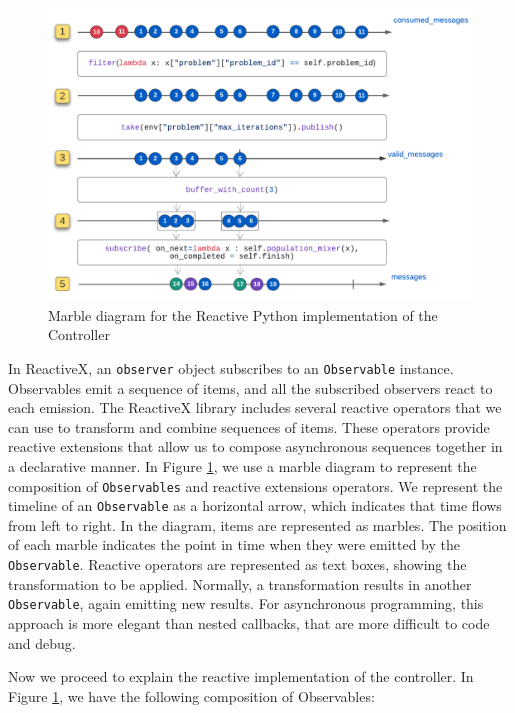 \documentclass[review]{elsarticle}
\begin{document}
\begin{figure}[ht]
    \centering
    \includegraphics[width=\textwidth]{marble_controller}
    \caption{Marble diagram for the Reactive Python implementation of the Controller}
    \label{fig:marble_controller}
\end{figure}

In ReactiveX, an \texttt{observer} object subscribes to an \texttt{Observable} instance. 
Observables emit a sequence of items, and all the subscribed observers react to each emission. The
ReactiveX library includes several reactive operators that we can use to
transform and combine sequences of items. These operators provide reactive
extensions that allow us to compose asynchronous sequences together in a
declarative manner. In Figure \ref{fig:marble_controller}, we use a marble diagram to
represent the composition of \texttt{Observables} and reactive extensions operators. We
represent the timeline of an \texttt{Observable} as a horizontal arrow, which indicates
that time flows from left to right. In the diagram, items are represented as
marbles. The position of each marble indicates the point in time when they were
emitted by the \texttt{Observable}. Reactive operators are represented as text boxes,
showing the transformation to be applied. Normally, a transformation results in
another \texttt{Observable}, again emitting new results.  For asynchronous programming, 
this approach is more elegant than nested callbacks, that are more difficult 
to code and debug. 

Now we proceed to explain the reactive implementation of the controller.
In Figure \ref{fig:marble_controller}, we  have the following composition of Observables:
\end{document}
